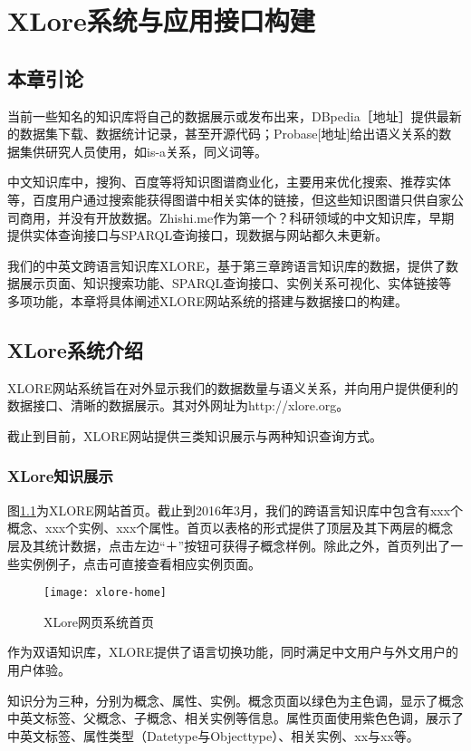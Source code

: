 \chapter{XLore系统与应用接口构建}
\label{cha:intro}

\section{本章引论}
当前一些知名的知识库将自己的数据展示或发布出来，DBpedia［地址］提供最新的数据集下载、数据统计记录，甚至开源代码；Probase[地址]给出语义关系的数据集供研究人员使用，如is-a关系，同义词等。

中文知识库中，搜狗、百度等将知识图谱商业化，主要用来优化搜索、推荐实体等，百度用户通过搜索能获得图谱中相关实体的链接，但这些知识图谱只供自家公司商用，并没有开放数据。Zhishi.me作为第一个？科研领域的中文知识库，早期提供实体查询接口与SPARQL查询接口，现数据与网站都久未更新。

我们的中英文跨语言知识库XLORE，基于第三章跨语言知识库的数据，提供了数据展示页面、知识搜索功能、SPARQL查询接口、实例关系可视化、实体链接等多项功能，本章将具体阐述XLORE网站系统的搭建与数据接口的构建。

\section{XLore系统介绍}
XLORE网站系统旨在对外显示我们的数据数量与语义关系，并向用户提供便利的数据接口、清晰的数据展示。其对外网址为http://xlore.org。

截止到目前，XLORE网站提供三类知识展示与两种知识查询方式。

\subsection{XLore知识展示}
图\ref{fig:xlore-home}为XLORE网站首页。截止到2016年3月，我们的跨语言知识库中包含有xxx个概念、xxx个实例、xxx个属性。首页以表格的形式提供了顶层及其下两层的概念层及其统计数据，点击左边“＋”按钮可获得子概念样例。除此之外，首页列出了一些实例例子，点击可直接查看相应实例页面。

\begin{figure}[H] 
  \centering
  \texttt{[image: xlore-home]}
  \caption{XLore网页系统首页}
  \label{fig:xlore-home}
\end{figure}

作为双语知识库，XLORE提供了语言切换功能，同时满足中文用户与外文用户的用户体验。

知识分为三种，分别为概念、属性、实例。概念页面以绿色为主色调，显示了概念中英文标签、父概念、子概念、相关实例等信息。属性页面使用紫色色调，展示了中英文标签、属性类型（Datetype与Objecttype）、相关实例、xx与xx等。

